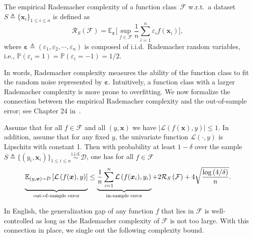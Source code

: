 \begin{definition} The empirical
Rademacher complexity of a function class~$\mathcal{F}$ w.r.t.~a dataset $S\triangleq\{\bm{x}_{i}\}_{1 \leq i \leq n}$  is
defined as
\begin{equation}
\mathcal{R}_{S}\left(\mathcal{F}\right)=\mathbb{E}_{\bm{\varepsilon}}\Big[\sup_{f\in\mathcal{F}}\frac{1}{n}\sum_{i=1}^{n}\varepsilon_{i}f\left(\bm{x}_{i}\right)\Big],\label{eq:empirical-rademacher-complexity}
\end{equation}
where $\bm{\varepsilon}\triangleq(\varepsilon_{1},\varepsilon_{2},\cdots,\varepsilon_{n})$
is composed of i.i.d.~Rademacher random variables, i.e., $\mathbb{P}(\varepsilon_{i}=1)=\mathbb{P}(\varepsilon_{i}=-1)=1/2$.
\end{definition}

In words, Rademacher complexity measures
the ability of the function class to fit the random noise represented
by $\bm{\varepsilon}$. Intuitively, a function class with a larger Rademacher
complexity is more prone to overfitting. We now formalize the connection between the empirical Rademacher complexity
and the out-of-sample error; see Chapter 24 in~\cite{shalev2014understanding}.

\begin{thm}Assume that for all $f\in\mathcal{F}$
and all $(y,\bm{x})$ we have $|\mathcal{L}(f(\bm{x}),y)|\leq1$.
In addition, assume that for any fixed $y$, the univariate function $\mathcal{L}(\cdot,y)$ 
is Lipschitz with constant 1. Then with probability at least $1-\delta$ over the sample $S\triangleq\{(y_{i},\bm{x}_{i})\}_{1\leq i\leq n}\overset{\mathrm{i.i.d.}}{\sim}\mathcal{D}$, one has for all $f\in\mathcal{F}$
\[
\underbrace{\vphantom{\frac{1}{n}\sum_{i=1}^{n}}\mathbb{E}_{(y,\bm{x})\sim \mathcal{D}}\left[\mathcal{L}\left(f(\bm{x}), y\right)\right]}_{\mathrm{out}\text{-}\mathrm{of}\text{-}\mathrm{sample\;error}}\leq\underbrace{\frac{1}{n}\sum_{i=1}^{n}\mathcal{L}\left(f(\bm{x}_{i}),y_{i}\right)}_{\mathrm{in}\text{-}\mathrm{sample\;error}}+2\mathcal{R}_{S}\left(\mathcal{F}\right)+4\sqrt{\frac{\log\left(4/\delta\right)}{n}}.
\]
\end{thm}
In English, the generalization gap of any function $f$ that lies in $\mathcal{F}$ is well-controlled as long as the Rademacher complexity of $\mathcal{F}$ is not too large. With this connection in place, we single out the
following complexity bound.

